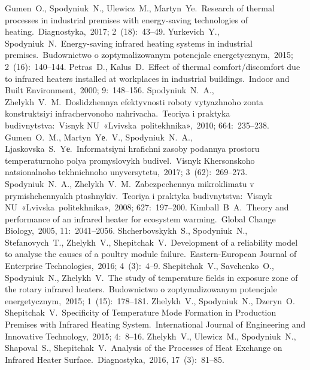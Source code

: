 \documentclass[12pt,twoside]{article}
\begin{document}
\begin{JGGarticle}
		\begin{thebibliography}{99}
				Gumen~O., Spodyniuk~N., Ulewicz~M., Martyn~Ye.\ Research of thermal processes in industrial premises with energy-saving technologies of heating.\ Diagnostyka,~2017; 2~(18):~43--49.
				Yurkevich~Y., Spodyniuk~N.\ Energy-saving infrared heating systems in industrial premises.\ Budownictwo o zoptymalizowanym potencjale energetycznym,~2015; 2~(16):~140--144.
				Petras~D., Kalus~D.\ Effect of thermal comfort/discomfort due to infrared heaters installed at workplaces in industrial buildings.\ Indoor and Built Environment,~2000; 9:~148--156.
				Spodyniuk~N.~A., Zhelykh~V.~M.\ Doslidzhennya efektyvnosti roboty vytyazhnoho zonta konstruktsiyi infrachervonoho nahrivacha.\ Teoriya i praktyka budivnytstva:~Visnyk NU~«Lvivska~politekhnika»,~2010; 664:~235--238.
				Gumen~O.~M., Martyn~Yе.~V., Spodyniuk~N.~A., Ljaskovska~S.~Yе.\ Informatsiyni hrafichni zasoby podannya prostoru temperaturnoho polya promyslovykh budivel.\ Visnyk Khersonskoho natsionalnoho tekhnichnoho unyversytetu,~2017; 3~(62):~269--273.
				Spodyniuk~N.~A., Zhelykh~V.~M.\ Zabezpechennya mikroklimatu v prymishchennyakh ptashnykiv.\ Teoriya i praktyka budivnytstva:~Visnyk NU~«Lvivska~politekhnika»,~2008; 627:~197--200.
				Kimball~B~A.\ Theory and performance of an infrared heater for ecosystem warming.\ Global Change Biology,~2005, 11:~2041--2056.
				Shcherbovskykh~S., Spodyniuk~N., Stefanovych~T., Zhelykh~V., Shepitchak~V.\ Development of a reliability model to analyse the causes of a poultry module failure.\ Eastern-European Journal of Enterprise Technologies,~2016; 4~(3):~4--9.
				Shepitchak~V., Savchenko~O., Spodyniuk~N., Zhelykh~V.\ The study of temperature fields in exposure zone of the rotary infrared heaters.\ Budownictwo o zoptymalizowanym potencjale energetycznym,~2015; 1~(15):~178--181.
				Zhelykh~V., Spodyniuk~N., Dzeryn~O. Shepitchak~V.\ Specificity of Temperature Mode Formation in Production Premises with Infrared Heating System.\ International Journal of Engineering and Innovative Technology,~2015; 4:~8--16.
				Zhelykh~V., Ulewicz~M., Spodyniuk~N., Shapoval~S., Shepitchak~V.\ Analysis of the Processes of Heat Exchange on Infrared Heater Surface.\ Diagnostyka,~2016, 17~(3):~81--85.

\end{thebibliography}
\end{JGGarticle}
\end{document}
